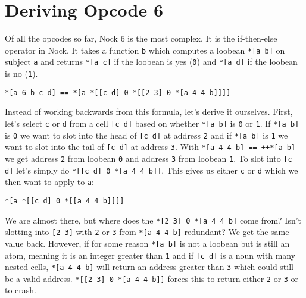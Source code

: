 \documentclass[twoside]{article}
\begin{document}
\section{Deriving Opcode 6}

Of all the opcodes so far, Nock 6 is the most complex. It is the if-then-else operator in Nock. It takes a function \lstinline[style=inlinecode]{b} which computes a loobean \lstinline[style=inlinecode]{*[a b]} on subject \lstinline[style=inlinecode]{a} and returns \lstinline[style=inlinecode]{*[a c]} if the loobean is yes (\lstinline[style=inlinecode]{0}) and \lstinline[style=inlinecode]{*[a d]} if the loobean is no (\lstinline[style=inlinecode]{1}).

\begin{lstlisting}[style=listingblock]
*[a 6 b c d] == *[a *[[c d] 0 *[[2 3] 0 *[a 4 4 b]]]]
\end{lstlisting}

Instead of working backwards from this formula, let's derive it ourselves. First, let's select \lstinline[style=inlinecode]{c} or \lstinline[style=inlinecode]{d} from a cell \lstinline[style=inlinecode]{[c d]} based on whether \lstinline[style=inlinecode]{*[a b]} is \lstinline[style=inlinecode]{0} or \lstinline[style=inlinecode]{1}. If \lstinline[style=inlinecode]{*[a b]} is \lstinline[style=inlinecode]{0} we want to slot into the head of \lstinline[style=inlinecode]{[c d]} at address \lstinline[style=inlinecode]{2} and if \lstinline[style=inlinecode]{*[a b]} is \lstinline[style=inlinecode]{1} we want to slot into the tail of \lstinline[style=inlinecode]{[c d]} at address \lstinline[style=inlinecode]{3}. With \lstinline[style=inlinecode]{*[a 4 4 b] == ++*[a b]} we get address \lstinline[style=inlinecode]{2} from loobean \lstinline[style=inlinecode]{0} and address \lstinline[style=inlinecode]{3} from loobean \lstinline[style=inlinecode]{1}. To slot into \lstinline[style=inlinecode]{[c d]} let's simply do \lstinline[style=inlinecode]{*[[c d] 0 *[a 4 4 b]]}. This gives us either \lstinline[style=inlinecode]{c} or \lstinline[style=inlinecode]{d} which we then want to apply to \lstinline[style=inlinecode]{a}:

\begin{lstlisting}[style=listingblock]
*[a *[[c d] 0 *[[a 4 4 b]]]]
\end{lstlisting}

We are almost there, but where does the \lstinline[style=inlinecode]{*[2 3] 0 *[a 4 4 b]} come from? Isn't slotting into \lstinline[style=inlinecode]{[2 3]} with \lstinline[style=inlinecode]{2} or \lstinline[style=inlinecode]{3} from \lstinline[style=inlinecode]{*[a 4 4 b]} redundant? We get the same value back. However, if for some reason \lstinline[style=inlinecode]{*[a b]} is not a loobean but is still an atom, meaning it is an integer greater than \lstinline[style=inlinecode]{1} and if \lstinline[style=inlinecode]{[c d]} is a noun with many nested cells, \lstinline[style=inlinecode]{*[a 4 4 b]} will return an address greater than \lstinline[style=inlinecode]{3} which could still be a valid address. \lstinline[style=inlinecode]{*[[2 3] 0 *[a 4 4 b]]} forces this to return either \lstinline[style=inlinecode]{2} or \lstinline[style=inlinecode]{3} or to crash.
\end{document}
